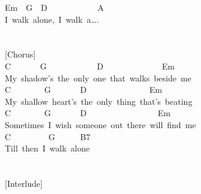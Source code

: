 \documentclass[]{book}
\begin{document}
Em~~G~~D~~~~~~~~~~~~A\\
\hspace*{0.333em}\hspace*{0.333em}\hspace*{0.333em}\hspace*{0.333em}\hspace*{0.333em}\hspace*{0.333em}\hspace*{0.333em}\hspace*{0.333em}\hspace*{0.333em}\hspace*{0.333em}\hspace*{0.333em}\hspace*{0.333em}I~walk~alone,~I~walk~a\ldots.\\
~\\
~\\
{[}Chorus{]}\\
C~~~~~~~G~~~~~~~~~~~~D~~~~~~~~~~~~~~Em\\
\hspace*{0.333em}\hspace*{0.333em}\hspace*{0.333em}\hspace*{0.333em}My~shadow's~the~only~one~that~walks~beside~me\\
C~~~~~~~~G~~~~~~~D~~~~~~~~~~~~~~~Em\\
\hspace*{0.333em}\hspace*{0.333em}\hspace*{0.333em}\hspace*{0.333em}My~shallow~heart's~the~only~thing~that's~beating\\
C~~~~~~~~G~~~~~~~D~~~~~~~~~~~~~~~~~Em\\
\hspace*{0.333em}\hspace*{0.333em}\hspace*{0.333em}\hspace*{0.333em}Sometimes~I~wish~someone~out~there~will~find~me\\
C~~~~~~~~~G~~~~~~B7\\
\hspace*{0.333em}\hspace*{0.333em}\hspace*{0.333em}\hspace*{0.333em}Till~then~I~walk~alone\\
~\\
~\\
{[}Interlude{]}\\
\end{document}
